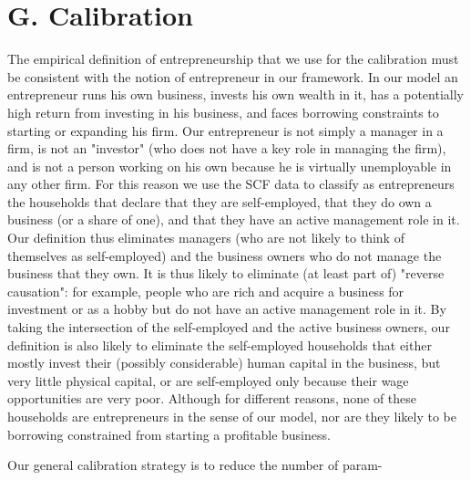 \documentclass[10pt]{article}
\begin{document}
\section*{G. Calibration}
The empirical definition of entrepreneurship that we use for the calibration must be consistent with the notion of entrepreneur in our framework. In our model an entrepreneur runs his own business, invests his own wealth in it, has a potentially high return from investing in his business, and faces borrowing constraints to starting or expanding his firm. Our entrepreneur is not simply a manager in a firm, is not an "investor" (who does not have a key role in managing the firm), and is not a person working on his own because he is virtually unemployable in any other firm. For this reason we use the SCF data to classify as entrepreneurs the households that declare that they are self-employed, that they do own a business (or a share of one), and that they have an active management role in it. Our definition thus eliminates managers (who are not likely to think of themselves as self-employed) and the business owners who do not manage the business that they own. It is thus likely to eliminate (at least part of) "reverse causation": for example, people who are rich and acquire a business for investment or as a hobby but do not have an active management role in it. By taking the intersection of the self-employed and the active business owners, our definition is also likely to eliminate the self-employed households that either mostly invest their (possibly considerable) human capital in the business, but very little physical capital, or are self-employed only because their wage opportunities are very poor. Although for different reasons, none of these households are entrepreneurs in the sense of our model, nor are they likely to be borrowing constrained from starting a profitable business.

Our general calibration strategy is to reduce the number of param-
\end{document}

